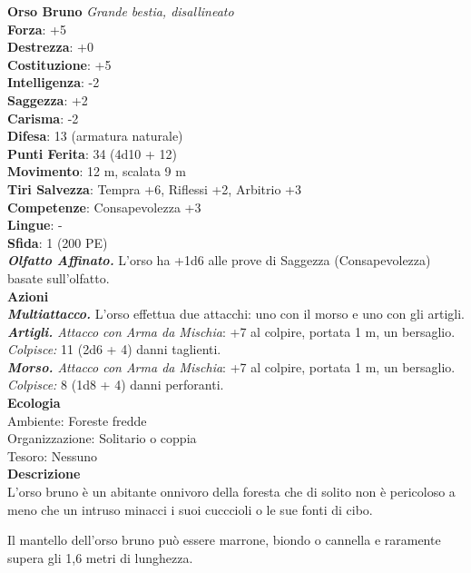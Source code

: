 \begin{multicols}{2}
\medskip\textbf{Orso Bruno}
\emph{Grande bestia, disallineato}\\
\textbf{Forza}: +5\\
\textbf{Destrezza}: +0\\
\textbf{Costituzione}: +5\\
\textbf{Intelligenza}: -2\\
\textbf{Saggezza}: +2\\
\textbf{Carisma}: -2\\
\textbf{Difesa}: 13 (armatura naturale)\\
\textbf{Punti Ferita}: 34 (4d10 + 12)\\
\textbf{Movimento}: 12 m, scalata 9 m\\
\textbf{Tiri Salvezza}: Tempra +6, Riflessi +2, Arbitrio +3 \\
\textbf{Competenze}: Consapevolezza +3\\
\textbf{Lingue}: -\\
\textbf{Sfida}: 1 (200 PE)\smallskip\\
\emph{\textbf{Olfatto Affinato.}} L'orso ha +1d6 alle prove di Saggezza (Consapevolezza) basate sull'olfatto.\\
\smallskip\textbf{Azioni}\\
\emph{\textbf{Multiattacco.}} L'orso effettua due attacchi: uno con il morso e uno con gli artigli.\\
\emph{\textbf{Artigli.} Attacco con Arma da Mischia}: +7 al colpire, portata 1 m, un bersaglio.\\
\emph{Colpisce:} 11 (2d6 + 4) danni taglienti.\\
\emph{\textbf{Morso.} Attacco con Arma da Mischia}: +7 al colpire, portata 1 m, un bersaglio.\\
\emph{Colpisce:} 8 (1d8 + 4) danni perforanti.\\
\textbf{Ecologia}\\
Ambiente: Foreste fredde\\
Organizzazione: Solitario o coppia\\
Tesoro: Nessuno\\
\textbf{Descrizione}\\

L'orso bruno è un abitante onnivoro della foresta che di solito non è pericoloso a meno che un intruso minacci i suoi cucccioli o le sue fonti di cibo.

Il mantello dell'orso bruno può essere marrone, biondo o cannella e raramente supera gli 1,6 metri di lunghezza. 


\end{multicols}
